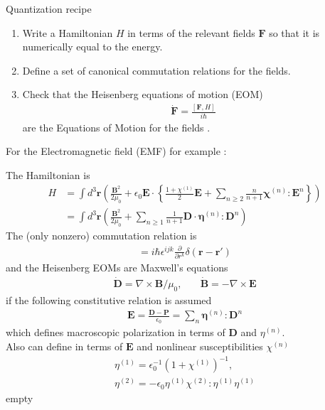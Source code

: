 \documentclass[final]{beamer} %
\begin{document}
\begin{frame}[t]
\begin{columns}[t]
\begin{column}{0.32\paperwidth}
\begin{alertblock}{Quantization recipe}

\begin{enumerate}
\item Write a Hamiltonian $H$ in terms of the relevant fields $\mathbf{F}$ so that it is numerically equal to the energy.
\item Define a set of canonical commutation relations for the fields.
\item \textcolor{brownish}{Check that the Heisenberg equations of motion (EOM) }
\begin{align}
\dot{ \mathbf{F} }   = \frac{[\mathbf{F},H]}{i \hbar}
\end{align}
\textcolor{brownish}{are the Equations of Motion for the fields} \cite{sipe}.\\
\end{enumerate}


\bigskip
For the Electromagnetic field (EMF) for example \cite{sipe,drummond}:
\item The Hamiltonian is 
\begin{align}
H&=\int d^3 \mathbf{r} \left(\frac{\mathbf{B}^2}{2 \mu_0}+  \epsilon_0 \mathbf{E} \cdot \left\{ \frac{1+\chi^{(1)}}{2}\mathbf{E} + \sum_{n \geq 2} \frac{n}{n+1}  \mathbf{\chi}^{(n)} : \mathbf{E}^n \right\} \right)\\
&=\int d^3\mathbf{r} \left(\frac{\mathbf{B}^2}{2 \mu_0} +\sum_{n\geq 1}\frac{1}{n+1}\mathbf{D}\cdot \mathbf{\eta}^{(n)} : \mathbf{D}^n\right)
\end{align}
The (only nonzero) commutation relation is 
\begin{align}
[D^i(\mathbf{r}),B^j(\mathbf{r'})]=i\hbar \epsilon^{ijk} \frac{\partial}{\partial r^k} \delta(\mathbf{r}-\mathbf{r}')
\end{align}
and the Heisenberg EOMs are Maxwell's equations
\begin{align}
\dot{\mathbf{D}} = \nabla \times  \mathbf{B}/\mu_0, \quad & \dot{\mathbf{B}} = -\nabla \times  \mathbf{E}
\end{align}
if the following constitutive relation is assumed 
\begin{align}\label{const}
\mathbf{E}=\frac{\mathbf{D}-\mathbf{P}}{\epsilon_0} = \sum_{n}\mathbf{\eta}^{(n)}: \mathbf{D}^n
\end{align}
which defines macroscopic polarization in terms of $\mathbf{D}$ and $\eta^{(n)}$. \\
Also can define in terms of $\mathbf{E}$ and nonlinear susceptibilities $\chi^{(n)}$
\begin{align}
\eta^{(1)} = \epsilon_0^{-1} (1+\chi^{(1)})^{-1}, \\
\eta^{(2)}=-\epsilon_0 \eta^{(1)} \chi^{(2)}: \eta^{(1)} \eta^{(1)}
\end{align}
{\color{white} empty}
\end{alertblock}


\end{column}
\end{columns}
\end{frame}
\end{document}
